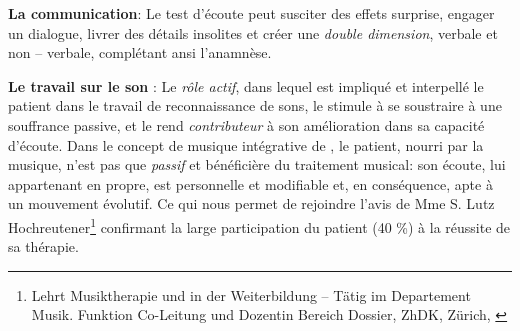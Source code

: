 



\textbf{La communication}:
  Le test d'écoute
  peut susciter des effets surprise, engager un dialogue, livrer des détails
 insolites et créer une \textit{double dimension}, verbale et
 non -- verbale, complétant ansi l'anamnèse.



 \textbf{Le travail sur le son} :
 Le \emph{rôle actif}, dans lequel est impliqué et interpellé le patient dans le travail
de reconnaissance de sons, le stimule à se soustraire à une souffrance
passive, et  le rend  \textit{contributeur} à son amélioration dans sa capacité
d'écoute.
Dans le concept de musique intégrative de \autocite[Cf.]
        {vrait_musicotherapie_2018}, le patient, nourri par
        la musique, n'est pas que \textit{passif }et
        bénéficière du traitement musical: son écoute, lui
        appartenant en propre, est personnelle et modifiable %
        et, en conséquence, apte à un mouvement évolutif.
Ce qui nous permet de rejoindre l'avis de Mme S. Lutz
 Hochreutener\footnote{Lehrt Musiktherapie und in der Weiterbildung – Tätig
 im Departement Musik. Funktion Co-Leitung und Dozentin Bereich
  Dossier, ZhDK, Zürich, \autocite {lutz_hochreutener_spiel_2009} }
 confirmant la large participation du patient (40 \%) à la réussite de sa thérapie.




